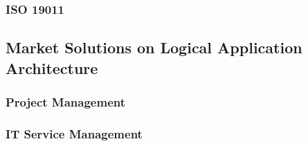 \subsubsection{ISO 19011}

\subsection{Market Solutions on Logical Application Architecture}

\subsubsection{Project Management}

\subsubsection{IT Service Management}




